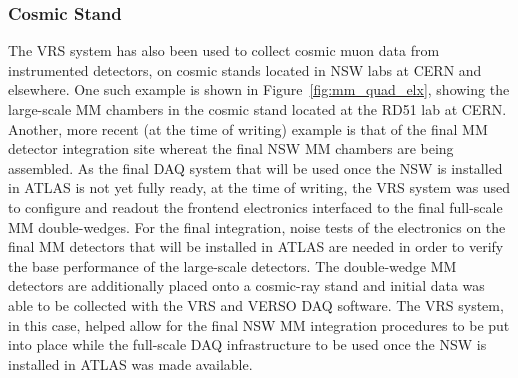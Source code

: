 \subsubsection{Cosmic Stand}
\label{sec:verso_cosmic}

The VRS system has also been used to collect cosmic muon data from instrumented detectors, on cosmic stands
located in NSW labs at CERN and elsewhere.
One such example is shown in Figure~\ref{fig:mm_quad_elx}, showing the large-scale MM chambers
in the cosmic stand located at the RD51 lab at CERN.
Another, more recent (at the time of writing) example is that of the final MM detector integration
site whereat the final NSW MM chambers are being assembled.
As the final DAQ system that will be used once the NSW is installed in ATLAS is not yet fully ready,
at the time of writing, the VRS system was used to configure and readout the frontend electronics
interfaced to the final full-scale MM double-wedges.
For the final integration, noise tests of the electronics on the final MM detectors that will be
installed in ATLAS are needed in order to verify the base performance of the large-scale detectors.
The double-wedge MM detectors are additionally placed onto a cosmic-ray stand and initial data was able to be
collected with the VRS and VERSO DAQ software.
The VRS system, in this case, helped allow for the final NSW MM integration procedures to be put into place
while the full-scale DAQ infrastructure to be used once the NSW is installed in ATLAS was made available.

